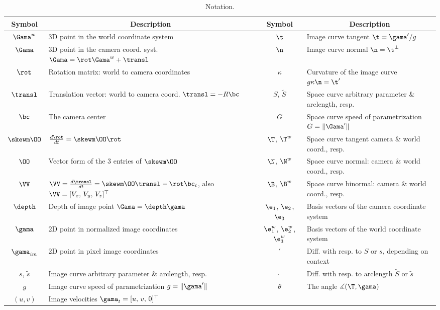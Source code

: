 \begin{table}
  \renewcommand{\arraystretch}{1.4}
  \renewcommand{\tabcolsep}{0.1cm}
  \begin{center}
  \tiny
  \begin{tabular}{|c|l||c|l|}
  \hline
  \multicolumn{1}{|c|}{\textbf{Symbol}} &
  \multicolumn{1}{c||}{\textbf{Description}}&
  \multicolumn{1}{|c|}{\textbf{Symbol}} &
  \multicolumn{1}{c|}{\textbf{Description}}\\\hline\hline
  $\Gama^w$ & 3D point in the world coordinate system &
  $\t$ & Image curve tangent $\t = \gama'/g$\\\hline
  $\Gama$ & 3D point in the camera coord. syst.  {\tiny$\Gama = \rot\Gama^w + \transl$} &
  $\n$ & Image curve normal $\n = \t^\perp$\\\hline
  $\rot$ & Rotation matrix: world to camera coordinates &
  $\kappa$ & Curvature of the image curve $g\kappa\n = \t'$\\\hline
  $\transl$ & Translation vector: world to camera coord. {\tiny $\transl =
  -R\bc$} &
  $S$, $\tilde S$ & Space curve arbitrary parameter \& arclength, resp.\\\hline
  $\bc$ & The camera center &
  $G$ & Space curve speed of parametrization $G = \|\Gama'\|$\\\hline
  $\skewm \OO$ & $\frac{d\rot}{dt} = \skewm \OO \rot$ &
  $\T$, $\T^w$ & Space curve tangent camera \& world coord., resp.\\\hline
  $\OO$ & Vector form of the 3 entries of $\skewm \OO$ &
  $\N$, $\N^w$ & Space curve normal: camera \& world coord., resp.\\\hline
  $\VV$ & $\VV = \frac{d\transl}{dt} = \skewm\OO\transl - \rot\bc_t$, also 
  $\VV = [V_x,\,V_y,\,V_z]^\top$
  &
  $\B$, $\B^w$ & Space curve binormal: camera \& world coord., resp.\\\hline
  $\depth$ & Depth of image point $\Gama = \depth\gama$ &
  $\e_1$, $\e_2$, $\e_3$ & Basis vectors of the camera coordinate system\\\hline
  $\gama$ & 2D point in normalized image coordinates &
  $\e_1^w$, $\e_2^w$, $\e_3^w$ & Basis vectors of the world coordinate system\\\hline
  $\gama_{im}$ & 2D point in pixel image coordinates &
  $'$ & Diff. with resp. to $S$ or $s$, depending on context\\\hline
  $s$, $\tilde s$ & Image curve arbitrary parameter \& arclength, resp. &
  $\dot\ $  & Diff. with resp. to arclength $\tilde S$ or $\tilde s$ \\\hline
  $g$ & Image curve speed of parametrization $g = \|\gama'\|$ & 
  $\theta$ & The angle $\measuredangle(\T,\gama)$\\\hline
  $(u,v)$ & Image velocities $\gama_t = [u,\,v,\,0]^\top$ & &\\\hline
 \end{tabular}
 \end{center}\label{tab:notation} 
 \caption{Notation.} 
\end{table}


